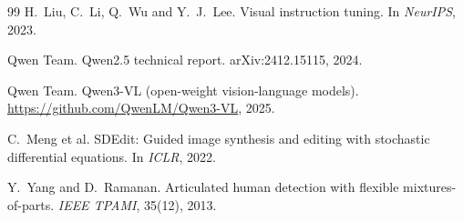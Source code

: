 \documentclass[11pt,a4paper,twocolumn]{article}
\begin{document}
\begin{thebibliography}{99}
H.~Liu, C.~Li, Q.~Wu and Y.~J.~Lee.
\newblock Visual instruction tuning.
\newblock In \emph{NeurIPS}, 2023.

Qwen Team.
\newblock Qwen2.5 technical report.
\newblock arXiv:2412.15115, 2024.

Qwen Team.
\newblock Qwen3-VL (open-weight vision-language models).
\newblock \url{https://github.com/QwenLM/Qwen3-VL}, 2025.

C.~Meng et al.
\newblock SDEdit: Guided image synthesis and editing with stochastic differential equations.
\newblock In \emph{ICLR}, 2022.

Y.~Yang and D.~Ramanan.
\newblock Articulated human detection with flexible mixtures-of-parts.
\newblock \emph{IEEE TPAMI}, 35(12), 2013.
\end{thebibliography}
\end{document}
